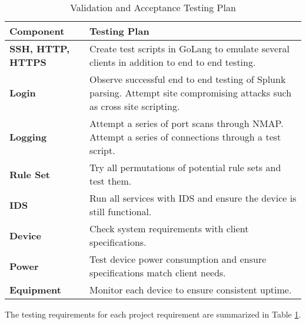 \begin{table}
\renewcommand{\arraystretch}{1.5}
\centering
\begin{tabular}{l | p{10cm}}
\textup{\Large {\bf Component}} & \textup{\Large {\bf Testing Plan}} \\
\hline \hline
\textbf{SSH, HTTP, HTTPS} & Create test scripts in GoLang to emulate several clients in addition to end to end testing. \\
\textbf{Login} & Observe successful end to end testing of Splunk parsing. Attempt site compromising attacks such as cross site scripting. \\
\textbf{Logging} & Attempt a series of port scans through NMAP. Attempt a series of connections through a test script. \\
\textbf{Rule Set} & Try all permutations of potential rule sets and test them. \\
\textbf{IDS} & Run all services with IDS and ensure the device is still functional. \\
\textbf{Device} & Check system requirements with client specifications. \\
\textbf{Power} & Test device power consumption and ensure specifications match client needs. \\
\textbf{Equipment} & Monitor each device to ensure consistent uptime. \\
\end{tabular}
\caption{Validation and Acceptance Testing Plan}
\label{table:vatest}
\end{table}

The testing requirements for each project requirement are summarized in
Table \ref{table:vatest}.

